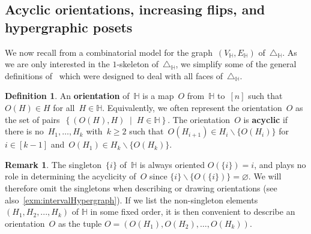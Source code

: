 \documentclass{amsart}
\theoremstyle{definition}
\newtheorem{definition}[theorem]{Definition}
\newtheorem{remark}[theorem]{Remark}
\newcommand{\set}[2]{\left\{ #1 \;\middle|\; #2 \right\}} %
\newcommand{\ssm}{\smallsetminus} %
\newcommand{\simplex}{\triangle} %
\newcommand{\defn}[1]{\textbf{\textsf{\color{PineGreen} #1}}} %
\newcommand{\HH}{\mathbb H}  %
\begin{document}

\subsection{Acyclic orientations, increasing flips, and hypergraphic posets} 
\label{subsec:P_H}

We now recall from \cite[Thm.~2.18]{BenedettiBergeronMachacek} a combinatorial model for the graph~$(V_\HH, E_\HH)$ of~$\simplex_\HH$.
As we are only interested in the $1$-skeleton of~$\simplex_\HH$, we simplify some of the general definitions of~\cite{BenedettiBergeronMachacek} which were designed to deal with all faces of~$\simplex_\HH$.

\begin{definition}
\label{def:acyclicOrientation}
An \defn{orientation} of~$\HH$ is a map~$O$ from~$\HH$ to~$[n]$ such that~$O(H) \in H$ for all~${H \in \HH}$.
Equivalently, we often represent the orientation~$O$ as the set of pairs~$\set{(O(H),H)}{H \in \HH}$.
The orientation~$O$ is \defn{acyclic} if there is no~$H_1, \dots, H_k$ with~$k \ge 2$ such that~$O(H_{i+1}) \in H_i \ssm \{O(H_i)\}$ for~$i \in [k-1]$ and~$O(H_1) \in H_k \ssm \{O(H_k)\}$.
\end{definition}

\begin{remark}
The singleton~$\{i\}$ of~$\HH$ is always oriented $O(\{i\})=i$, and plays no role in determining  the acyclicity of~$O$ since $\{i\} \ssm \{O(\{i\})\} = \varnothing$.
We will therefore omit the singletons when describing or drawing orientations (see also~\cref{exm:intervalHypergraph}).
If we list the non-singleton elements $(H_1,H_2,...,H_k)$ of $\HH$ in some fixed order, it is then convenient to describe an orientation~$O$ as the tuple $O=(O(H_1),O(H_2),\ldots,O(H_k))$. 
\end{remark}
\end{document}
